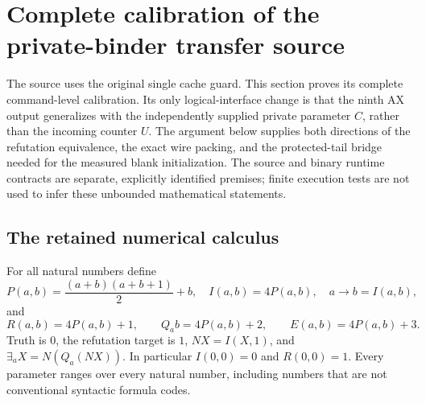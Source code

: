 \section{Complete calibration of the private-binder transfer source}
\label{sec:genc-calibration}

The source  uses the original single
cache guard.  This section proves its complete command-level calibration.
Its only logical-interface change is that the ninth
AX output generalizes with the independently supplied private parameter
$C$, rather than the incoming counter $U$.  The argument below supplies
both directions of the refutation equivalence, the exact wire packing,
and the protected-tail bridge needed for the measured blank initialization.
The source and binary runtime contracts are separate, explicitly identified
premises; finite execution tests are not used to infer these unbounded
mathematical statements.

\subsection{The retained numerical calculus}

For all natural numbers define
\[
 P(a,b)=\frac{(a+b)(a+b+1)}2+b,
 \quad I(a,b)=4P(a,b),\quad a\to b=I(a,b),
\]
and
\[
 R(a,b)=4P(a,b)+1,\qquad Q_a b=4P(a,b)+2,
 \qquad E(a,b)=4P(a,b)+3.
\]
Truth is $0$, the refutation target is $1$, $NX=I(X,1)$, and
$\exists_aX=N(Q_a(NX))$.  In particular $I(0,0)=0$ and $R(0,0)=1$.
Every parameter ranges over every natural number, including numbers that
are not conventional syntactic formula codes.

